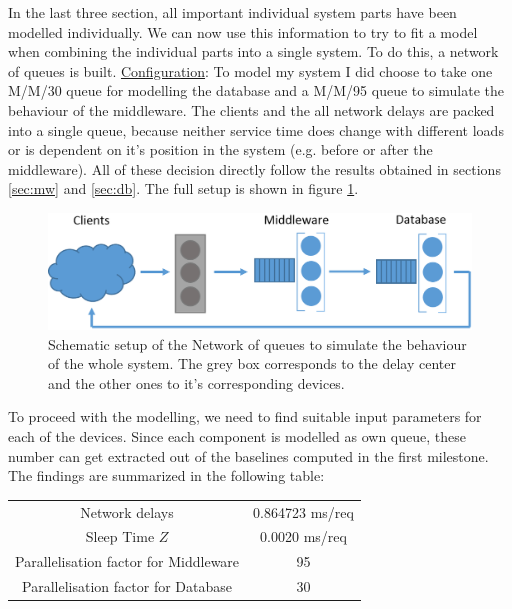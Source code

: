 \documentclass[11pt]{article}
\begin{document}
In the last three section, all important individual system parts have been modelled individually. We can now use this information to try to fit a model when combining the individual parts into a single system. To do this, a network of queues is built.
\newline\underline{Configuration}: To model my system I did choose to take one M/M/30 queue for modelling the database and a M/M/95 queue to simulate the behaviour of the middleware. The clients and the all network delays are packed into a single queue, because neither service time does change with different loads or is dependent on it's position in the system (e.g. before or after the middleware). All of these decision directly follow the results obtained in sections \ref{sec:mw} and \ref{sec:db}. The full setup is shown in figure \ref{fig:networkofqueues}.
\begin{figure}[!htb]
\centering
\includegraphics[width=1.0\linewidth]{figures/mva/networkofqueues}
\caption{Schematic setup of the Network of queues to simulate the behaviour of the whole system. The grey box corresponds to the delay center and the other ones to it's corresponding devices.}
\label{fig:networkofqueues}
\end{figure}
To proceed with the modelling, we need to find suitable input parameters for each of the devices. Since each component is modelled as own queue, these number can get extracted out of the baselines computed in the first milestone. The findings are summarized in the following table:

\begin{center}
	\begin{tabular}{c|c}
		\hline
		Network delays & 0.864723 ms/req \\
		Sleep Time $Z$ & 0.0020 ms/req \\
		Parallelisation factor for Middleware & 95 \\
		Parallelisation factor for Database & 30 \\
		\hline
	\end{tabular}
	\label{tbl:params}
\end{center}
\end{document}
